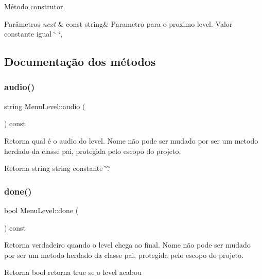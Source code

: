 Método construtor. 


\begin{DoxyParams}{Parâmetros}
{\em next} & const string\& Parametro para o proximo level. Valor constante igual \char`\"{} \char`\"{}, \\
\hline
\end{DoxyParams}


\subsection{Documentação dos métodos}
\mbox{\label{classMenuLevel_a3293e74cafcf37c8d2b7cf79ded54d37}} 
\subsubsection{\texorpdfstring{audio()}{audio()}}
{\footnotesize\ttfamily string Menu\+Level\+::audio (\begin{DoxyParamCaption}{ }\end{DoxyParamCaption}) const}



Retorna qual é o audio do level. Nome não pode ser mudado por ser um metodo herdado da classe pai, protegida pelo escopo do projeto. 

\begin{DoxyReturn}{Retorna}
string string constante \char`\"{}.\char`\"{} 
\end{DoxyReturn}
\mbox{\label{classMenuLevel_a2d5ce9ee9de62719ca8225509f0e53b3}} 
\subsubsection{\texorpdfstring{done()}{done()}}
{\footnotesize\ttfamily bool Menu\+Level\+::done (\begin{DoxyParamCaption}{ }\end{DoxyParamCaption}) const}



Retorna verdadeiro quando o level chega ao final. Nome não pode ser mudado por ser um metodo herdado da classe pai, protegida pelo escopo do projeto. 

\begin{DoxyReturn}{Retorna}
bool retorna \textquotesingle{}true\textquotesingle{} se o level acabou 
\end{DoxyReturn}
\mbox{\label{classMenuLevel_a62ac78a0d9ddbe89ef41b9c13f8db99f}} 
